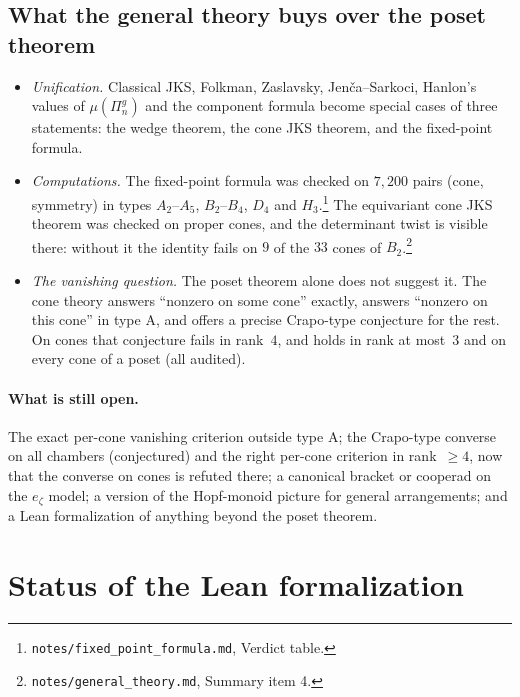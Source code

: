 \documentclass[11pt]{article}
\theoremstyle{definition}
\theoremstyle{remark}
\newcommand{\src}[1]{\nolinkurl{#1}}
\newcommand{\tagbox}[1]{\leavevmode\marginpar{\raggedright\fbox{\parbox{0.66in}{\centering\scriptsize\sffamily #1}}}}
\newcommand{\COMPUTED}{\tagbox{COMPUTED}}
\begin{document}
\subsection{What the general theory buys over the poset theorem}

\begin{itemize}
\item \emph{Unification.} Classical JKS, Folkman, Zaslavsky,
  Jen\v{c}a--Sarkoci, Hanlon's values of $\mu(\Pi_n^g)$ and the
  component formula become special cases of three statements: the wedge
  theorem, the cone JKS theorem, and the fixed-point formula.
\item \emph{Computations.} The fixed-point formula was checked on $7{,}200$
  pairs (cone, symmetry) in types $A_2$--$A_5$, $B_2$--$B_4$, $D_4$ and
  $H_3$.\footnote{\src{notes/fixed_point_formula.md}, Verdict table.}%
  \COMPUTED{} The equivariant cone JKS theorem was checked on proper cones,
  and the determinant twist is visible there: without it the identity fails
  on $9$ of the $33$ cones of $B_2$.\footnote{\src{notes/general_theory.md},
  Summary item 4.}
\item \emph{The vanishing question.} The poset theorem alone does not
  suggest it. The cone theory answers ``nonzero on some cone'' exactly,
  answers ``nonzero on this cone'' in type A, and offers a
  precise Crapo-type conjecture for the rest. On cones that conjecture
  fails in rank~$4$, and holds in rank at most~$3$ and on every cone of a
  poset (all audited).
\end{itemize}

\paragraph{What is still open.} The exact per-cone vanishing criterion
outside type A; the Crapo-type converse on all chambers (conjectured) and
the right per-cone criterion in rank~$\ge 4$, now that the converse on cones
is refuted there;
a canonical bracket or cooperad on the $e_\zeta$ model; a version of the
Hopf-monoid picture for general arrangements; and a Lean formalization of anything beyond the
poset theorem.

\section{Status of the Lean formalization}\label{sec:lean}
\end{document}
